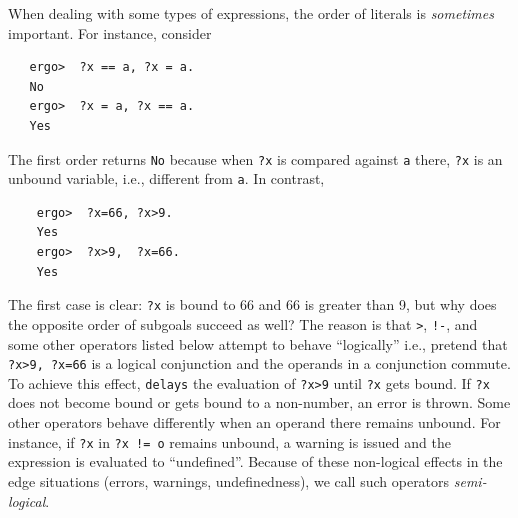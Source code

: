 \documentclass[11pt]{article}
\newcommand{\ERGO}{\mbox{\smaller{\ensuremath{\cal{E}}\smaller{{\sc{RGO}}}}}\xspace}
\newcommand{\FLSYSTEM}{\ERGO}
\begin{document}
When dealing with some types of expressions, the order of literals is
\emph{sometimes} important.
For instance, consider
\begin{verbatim}
   ergo>  ?x == a, ?x = a.
   No
   ergo>  ?x = a, ?x == a.
   Yes
\end{verbatim}
The first order returns \texttt{No}  because when \texttt{?x} is compared against
\texttt{a} there, \texttt{?x} is an unbound variable, i.e., different from
\texttt{a}.     
In contrast,
\begin{verbatim}
    ergo>  ?x=66, ?x>9.
    Yes
    ergo>  ?x>9,  ?x=66.
    Yes
\end{verbatim}
The first case is clear: \texttt{?x} is bound to 66 and 66 is greater than
9, but why does the opposite order of subgoals succeed as well? The reason
is that  \texttt{>}, \texttt{!-}, and some other operators listed below
attempt to behave ``logically'' i.e., pretend that \texttt{?x>9,  ?x=66} is
a logical conjunction and the operands in a conjunction commute. To achieve
this effect, \FLSYSTEM \texttt{delays}   the evaluation of \texttt{?x>9} until
\texttt{?x}  gets bound. If \texttt{?x} does not become bound or gets bound
to a non-number, an error is thrown.
Some other operators behave differently when 
an operand there remains unbound. For instance, if \texttt{?x} in
\texttt{?x != o} remains unbound, a warning is issued and the expression is
evaluated to ``undefined''.
Because of these non-logical effects in the edge situations (errors,
warnings, undefinedness), we call such operators \emph{semi-logical}. 
\label{pg-semi-logical}
  
\end{document}
